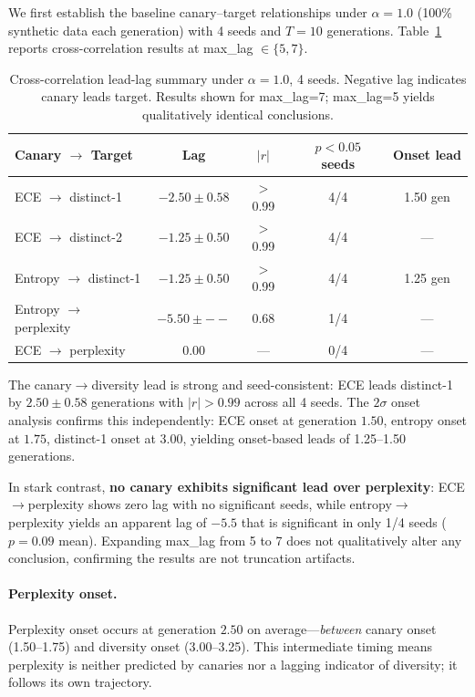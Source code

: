 \documentclass[letterpaper,11pt]{article}
\begin{document}
We first establish the baseline canary--target relationships under $\alpha = 1.0$ (100\% synthetic data each generation) with 4 seeds and $T=10$ generations.
Table~\ref{tab:mvp} reports cross-correlation results at max\_lag $\in \{5, 7\}$.

\begin{table}[t]
\centering
\caption{Cross-correlation lead-lag summary under $\alpha=1.0$, 4 seeds. Negative lag indicates canary leads target. Results shown for max\_lag=7; max\_lag=5 yields qualitatively identical conclusions.}
\label{tab:mvp}
\small
\begin{tabular}{@{}lcccc@{}}
\toprule
Canary $\to$ Target & Lag & $|r|$ & $p < 0.05$ seeds & Onset lead \\
\midrule
ECE $\to$ distinct-1 & $-2.50 \pm 0.58$ & $>$0.99 & 4/4 & 1.50 gen \\
ECE $\to$ distinct-2 & $-1.25 \pm 0.50$ & $>$0.99 & 4/4 & --- \\
Entropy $\to$ distinct-1 & $-1.25 \pm 0.50$ & $>$0.99 & 4/4 & 1.25 gen \\
Entropy $\to$ perplexity & $-5.50 \pm --$ & 0.68 & 1/4 & --- \\
ECE $\to$ perplexity & $0.00$ & --- & 0/4 & --- \\
\bottomrule
\end{tabular}
\end{table}

The canary$\to$diversity lead is strong and seed-consistent: ECE leads distinct-1 by $2.50 \pm 0.58$ generations with $|r| > 0.99$ across all 4 seeds.
The $2\sigma$ onset analysis confirms this independently: ECE onset at generation $1.50$, entropy onset at $1.75$, distinct-1 onset at $3.00$, yielding onset-based leads of 1.25--1.50 generations.

In stark contrast, \textbf{no canary exhibits significant lead over perplexity}: ECE$\to$perplexity shows zero lag with no significant seeds, while entropy$\to$perplexity yields an apparent lag of $-5.5$ that is significant in only 1/4 seeds ($p = 0.09$ mean).
Expanding max\_lag from 5 to 7 does not qualitatively alter any conclusion, confirming the results are not truncation artifacts.

\paragraph{Perplexity onset.} Perplexity onset occurs at generation $2.50$ on average---\emph{between} canary onset (1.50--1.75) and diversity onset (3.00--3.25).
This intermediate timing means perplexity is neither predicted by canaries nor a lagging indicator of diversity; it follows its own trajectory.
\end{document}
